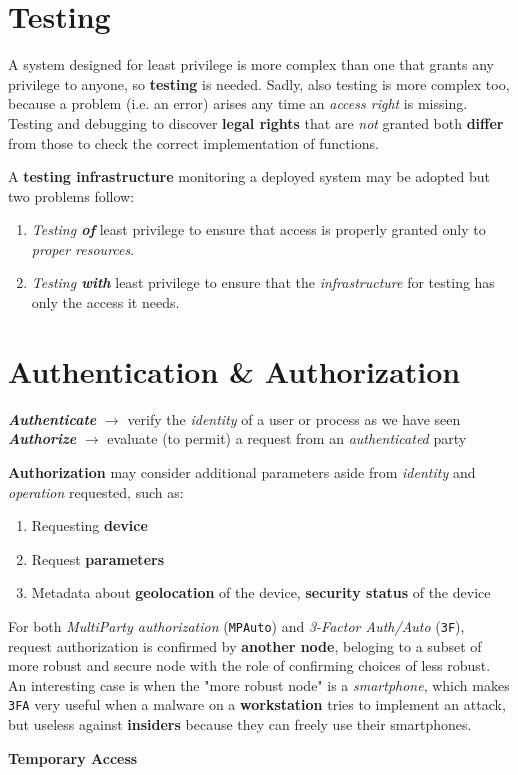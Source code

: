 \section{Testing}
A system designed for least privilege is more complex than one that grants any privilege to anyone,
so \textbf{testing} is needed.
Sadly, also testing is more complex too, because a problem (i.e. an error) arises any time an \textit{access right} is missing.
Testing and debugging to discover \textbf{legal rights} that are \textit{not} granted both
\textbf{differ} from those to check the correct implementation of functions.

A \textbf{testing infrastructure} monitoring a deployed system may be adopted but two problems follow:
\begin{enumerate}
   \item \textit{Testing \textbf{of}} least privilege to ensure that access is properly granted only to
   \textit{proper resources}.
   \item \textit{Testing \textbf{with}} least privilege to ensure that the \textit{infrastructure} for testing has only
   the access it needs.
\end{enumerate}

\section{Authentication \& Authorization}
\begin{center}
   \textit{\textbf{Authenticate}} $\longrightarrow$ verify the \textit{identity} of a user or process as we have seen\\
   \textit{\textbf{Authorize}} $\longrightarrow$ evaluate (to permit) a request from an \textit{authenticated} party
\end{center}
\textbf{Authorization} may consider additional parameters aside from \textit{identity} and \textit{operation} requested, such as:
\begin{enumerate}
   \item Requesting \textbf{device}
   \item Request \textbf{parameters}
   \item Metadata about \textbf{geolocation} of the device, \textbf{security status} of the device
\end{enumerate}

For both \textit{MultiParty authorization} (\texttt{MPAuto}) and \textit{3-Factor Auth/Auto} (\texttt{3F}), 
request authorization is confirmed by \textbf{another node},
beloging to a subset of more robust and secure node with the role of confirming choices of less robust.\\
An interesting case is when the "more robust node" is a \textit{smartphone},
which makes \texttt{3FA} very useful when a malware on a \textbf{workstation} tries to implement an attack,
but useless against \textbf{insiders} because they can freely use their smartphones.

\textbf{Temporary Access}